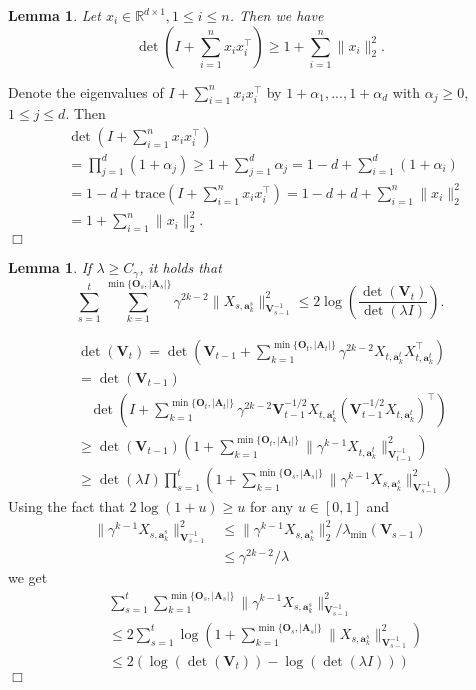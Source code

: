 \documentclass{article}
\newcommand{\bA}{\mathbf{A}}
\newcommand{\ba}{\mathbf{a}}
\newcommand{\bO}{\mathbf{O}}
\newcommand{\bV}{\mathbf{V}}
\newcommand{\RR}{\mathbb{R}}
\newcommand{\trace}{\mathrm{trace}}
\newcommand{\abs}[1]{\left| #1 \right|}
\newcommand{\norm}[1]{\| #1 \|}
\newtheorem{lemma}[theorem]{Lemma}%
\newenvironment{proof}{\noindent {\textbf{Proof. }}}{$\Box$ \medskip}
\begin{document}
\begin{lemma} %
Let $x_i \in \RR^{d \times 1}, 1 \leq i \leq n$. Then we have
$$
\det(I + \sum_{i=1}^n x_i x_i^{\top}) \geq 1 + \sum_{i=1}^n \norm{x_i}_2^2.
$$
\end{lemma}
\begin{proof}
Denote the eigenvalues of $I + \sum_{i=1}^n x_i x_i^{\top}$ by $1+\alpha_1,...,1+\alpha_d$ with $\alpha_j \geq 0$, $1\leq j\leq d$. Then
\begin{align*}
&\det(I + \sum_{i=1}^n x_i x_i^{\top})\\
&= \prod_{j=1}^d (1 + \alpha_j)\geq 1 +\sum_{j=1}^d \alpha_j =1-d + \sum_{i=1}^d (1+\alpha_i) \\
&=1-d + \trace(I + \sum_{i=1}^n x_i x_i^{\top})= 1-d + d + \sum_{i=1}^n \norm{x_i}_2^2\\
&=1 + \sum_{i=1}^n \norm{x_i}_2^2.
\end{align*}
\end{proof}

\begin{lemma}
If $\lambda \geq C_\gamma$, it holds that
$$
\sum_{s=1}^t \sum_{k=1}^{\min\{\bO_s, \abs{\bA_s}\}}\gamma^{2k-2}\norm{X_{s,\ba_{k}^s}}_{\bV_{s-1}^{-1}}^2 \leq 2\log(\frac{\det(\bV_t)}{\det(\lambda I)}).
$$
\end{lemma}
\begin{proof}
\begin{align*}
&\det(\bV_t) = \det(\bV_{t-1} + \sum_{k=1}^{\min\{\bO_t, \abs{\bA_t}\}} \gamma^{2k-2}X_{t,\ba_k^{t}}X_{t, \ba_k^{t}}^{\top})\\
&=\det(\bV_{t-1})\\
&~~~~\det(I + \sum_{k=1}^{\min\{\bO_t, \abs{\bA_t}\}} \gamma^{2k-2}\bV_{t-1}^{-1/2}X_{t,\ba_{k}^{t}} (\bV_{t-1}^{-1/2}X_{t,\ba_{k}^{t}})^{\top})\\
&\geq \det(\bV_{t-1}) (1 + \sum_{k=1}^{\min\{\bO_t, \abs{\bA_t}\}} \norm{\gamma^{k-1}X_{t,\ba_k^t}}_{\bV_{t-1}^{-1}}^2)\\
&\geq \det(\lambda I)\prod_{s=1}^{t}(1 + \sum_{k=1}^{\min\{\bO_s, \abs{\bA_s}\}} \norm{\gamma^{k-1}X_{s,\ba_k^s}}_{\bV_{s-1}^{-1}}^2)
\end{align*}
Using the fact that $ 2\log(1+u) \geq u$ for any $u \in [0,1]$ and 
\begin{align*}
\norm{\gamma^{k-1}X_{s,\ba_k^s}}_{\bV_{s-1}^{-1}}^2 &\leq \norm{\gamma^{k-1}X_{s,\ba_k^s}}_2^2/\lambda_{\min}(\bV_{s-1})\\
& \leq \gamma^{2k-2}/\lambda
\end{align*}
we get
\begin{align*}
&\sum_{s=1}^t \sum_{k=1}^{\min\{\bO_s, \abs{\bA_s}\}}\norm{\gamma^{k-1}X_{s,\ba_{k}^s}}_{\bV_{s-1}^{-1}}^2 \\
&\leq 2\sum_{s=1}^t\log(1 + \sum_{k=1}^{\min\{\bO_s, \abs{\bA_s}\}} \norm{X_{s,\ba_k^s}}_{\bV_{s-1}^{-1}}^2)\\
&\leq 2(\log(\det(\bV_t)) - \log(\det(\lambda I)))
\end{align*}
\end{proof}
	
	
\nocite{langley00}
	


	
\end{document}
